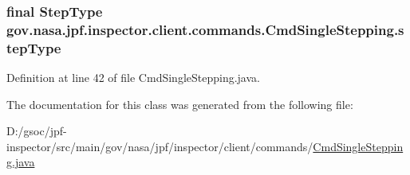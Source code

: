 \subsubsection[{\texorpdfstring{step\+Type}{stepType}}]{\setlength{\rightskip}{0pt plus 5cm}final {\bf Step\+Type} gov.\+nasa.\+jpf.\+inspector.\+client.\+commands.\+Cmd\+Single\+Stepping.\+step\+Type\hspace{0.3cm}{\ttfamily [private]}}\hypertarget{classgov_1_1nasa_1_1jpf_1_1inspector_1_1client_1_1commands_1_1_cmd_single_stepping_a9888f2543c87e6e21a850b215d79b389}{}\label{classgov_1_1nasa_1_1jpf_1_1inspector_1_1client_1_1commands_1_1_cmd_single_stepping_a9888f2543c87e6e21a850b215d79b389}


Definition at line 42 of file Cmd\+Single\+Stepping.\+java.



The documentation for this class was generated from the following file\+:\begin{DoxyCompactItemize}
\item 
D\+:/gsoc/jpf-\/inspector/src/main/gov/nasa/jpf/inspector/client/commands/\hyperlink{_cmd_single_stepping_8java}{Cmd\+Single\+Stepping.\+java}\end{DoxyCompactItemize}

